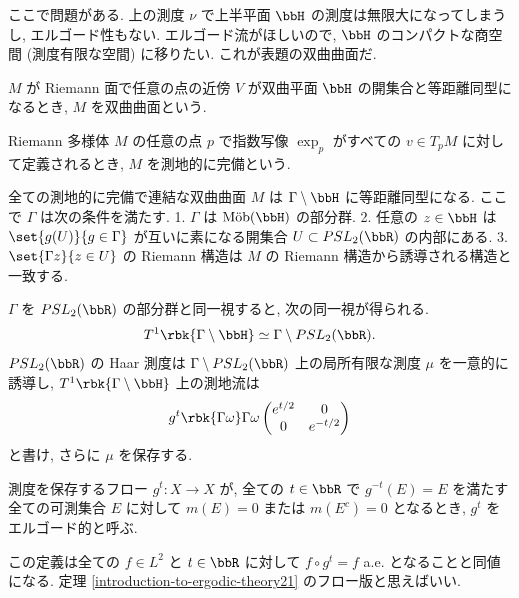 \documentclass[openany, a4paper, oneside]{jsbook}
\begin{document}
ここで問題がある.
上の測度 $\nu$ で上半平面 $\bbH$ の測度は無限大になってしまうし, エルゴード性もない.
エルゴード流がほしいので, $\bbH$ のコンパクトな商空間 (測度有限な空間) に移りたい.
これが表題の双曲曲面だ.
\begin{defn}[双曲曲面]
$M$ が Riemann 面で任意の点の近傍 $V$ が双曲平面 $\bbH$ の開集合と等距離同型になるとき,
$M$ を双曲曲面という.
\end{defn}
\begin{defn}
Riemann 多様体 $M$ の任意の点 $p$ で指数写像 $\exp_p$ がすべての
$v \in T_p M$ に対して定義されるとき, $M$ を測地的に完備という.
\end{defn}
\begin{thm}
全ての測地的に完備で連結な双曲曲面 $M$ は $\Gamma \setminus \bbH$ に等距離同型になる.
ここで $\Gamma$ は次の条件を満たす.
1. $\Gamma$ は $\mathrm{\text{M\"ob}} (\bbH)$ の部分群.
2. 任意の $z \in \bbH$ は $\set{g(U)}{g \in \Gamma}$ が互いに素になる開集合 $U \subset PSL_2(\bbR)$ の内部にある.
3. $\set{\Gamma z}{z \in U}$ の Riemann 構造は $M$ の Riemann 構造から誘導される構造と一致する.
\end{thm}
$\Gamma$ を $PSL_2 (\bbR)$ の部分群と同一視すると, 次の同一視が得られる.
\begin{align}
 T^1 \rbk{\Gamma \setminus \bbH}
 \simeq
 \Gamma \setminus PSL_2 (\bbR).
\end{align}
$PSL_2 (\bbR)$ の Haar 測度は $\Gamma \setminus PSL_2 (\bbR)$ 上の局所有限な測度 $\mu$ を一意的に誘導し,
$T^1 \rbk{\Gamma \setminus \bbH}$ 上の測地流は
\begin{align}
 g^t \rbk{\Gamma \omega}
 \Gamma \omega
 \begin{pmatrix}
  e^{t/2} & 0 \\
  0       & e^{- t / 2}
 \end{pmatrix}
\end{align}
と書け, さらに $\mu$ を保存する.

\begin{defn}\label{introduction-to-ergodic-theory22}
測度を保存するフロー $g^t \colon X \to X$ が, 全ての $t \in \bbR$ で
$g^{-t} (E) = E$ を満たす全ての可測集合 $E$ に対して $m(E) = 0$ または $m(E^c) = 0$ となるとき,
$g^t$ をエルゴード的と呼ぶ.
\end{defn}
\begin{rem}\label{introduction-to-ergodic-theory9}
この定義は全ての $f \in L^2$ と $t \in \bbR$ に対して $f \circ g^t = f$ a.e. となることと同値になる.
定理 \ref{introduction-to-ergodic-theory21} のフロー版と思えばいい.
\end{rem}
\end{document}
